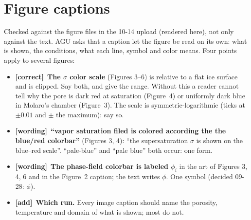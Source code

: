 \documentclass[11pt]{article}
\newcommand{\tC}{\textcolor{miss}{\textbf{[correct]}}\ }
\newcommand{\tG}{\textcolor{stale}{\textbf{[wording]}}\ }
\newcommand{\tA}{\textcolor{have}{\textbf{[add]}}\ }
\begin{document}
\section*{Figure captions}
Checked against the figure files in the 10-14 upload (rendered here), not
only against the text. AGU asks that a caption let the figure be read on its
own: what is shown, the conditions, what each line, symbol and color means.
Four points apply to several figures:
\begin{itemize}
\item \tC \textbf{The $\sigma$ color scale} (Figures 3--6) is relative to a
  flat ice surface and is clipped. Say both, and give the range. Without this
  a reader cannot tell why the pore is dark red at saturation (Figure~4) or
  uniformly dark blue in Molaro's chamber (Figure~3). The scale is
  symmetric-logarithmic (ticks at $\pm0.01$ and $\pm$ the maximum): say so.
\item \tG \textbf{``vapor saturation filed is colored according the the
  blue/red colorbar''} (Figures 3, 4): ``the supersaturation $\sigma$ is
  shown on the blue--red scale''. ``pale-blue'' and ``pale blue'' both occur:
  one form.
\item \tG \textbf{The phase-field colorbar is labeled $\phi_i$} in the art
  of Figures 3, 4, 6 and in the Figure~2 caption; the text writes $\phi$.
  One symbol (decided 09-28: $\phi$).
\item \tA \textbf{Which run.} Every image caption should name the porosity,
  temperature and domain of what is shown; most do not.
\end{itemize}
\end{document}
